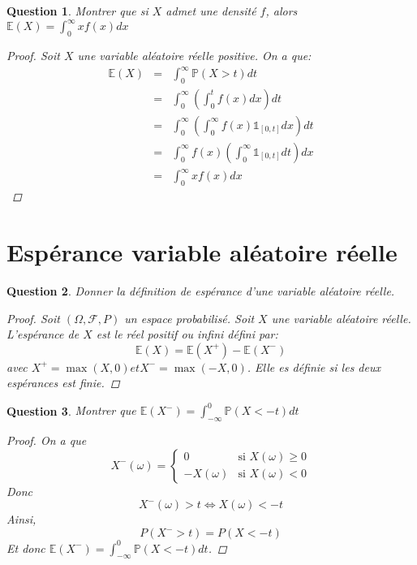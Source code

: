 \documentclass{article}
\theoremstyle{plain}
\newtheorem{question}{Question}
\begin{document}
\begin{question}
	Montrer que si $X$ admet une densité $f$, alors $\mathbb{E} (X) = \int_0^{\infty} x f(x) dx$
	\begin{proof}
		Soit $X$ une variable aléatoire réelle positive. On a que:
		\begin{eqnarray*}
			\mathbb{E} (X) &=& \int_0^{\infty} \mathbb{P} (X > t) dt \\
			&=& \int_0^{\infty} \left( \int_0^{t} f(x) dx \right) dt \\
			&=& \int_0^{\infty} \left( \int_0^{\infty} f(x) \mathds{1}_{[0, t]} dx \right) dt \\
			&=& \int_0^{\infty} f(x) \left( \int_0^{\infty} \mathds{1}_{[0, t]} dt \right) dx \\
			&=& \int_0^{\infty} x f(x) dx
		\end{eqnarray*}
	\end{proof}

\end{question}

\section{Espérance variable aléatoire réelle}

\begin{question}
	Donner la définition de espérance d'une variable aléatoire réelle.
	\begin{proof}
		Soit $(\Omega, \mathscr{F}, P)$ un espace probabilisé. Soit $X$ une variable aléatoire réelle. L'espérance de $X$ est le réel positif ou infini défini par:
		\begin{equation*}
			\mathbb{E} (X) = \mathbb{E} (X^+) - \mathbb{E} (X^-)
		\end{equation*}
		avec $X^+ = \max(X, 0) et X^- = \max(-X, 0)$. Elle es définie si les deux espérances est finie.
	\end{proof}
\end{question}

\begin{question}
	Montrer que $\mathbb{E} (X^-) = \int_{-\infty}^0 \mathbb{P} (X < -t) dt$

	\begin{proof}
		On a que
		\begin{equation*}
			X^-(\omega) = \left\{
			\begin{aligned}
				0          & \text{si $X(\omega) \geq 0$} \\
				-X(\omega) & \text{si $X(\omega) < 0$}
			\end{aligned}
			\right.
		\end{equation*}
		Donc
		\[X^-(\omega) > t \iff X(\omega) < -t\]
		Ainsi,
		\[P(X^- > t) = P(X < -t)\]
		Et donc $\mathbb{E} (X^-) = \int_{-\infty}^0 \mathbb{P} (X < -t) dt$.
	\end{proof}
\end{question}
\end{document}
